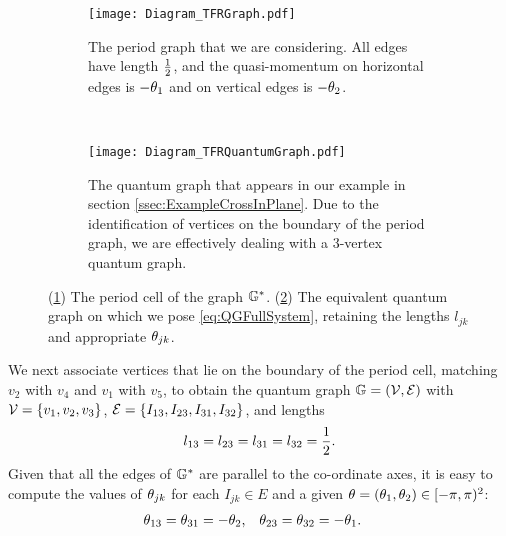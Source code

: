 \begin{figure}[t]
	\centering
	\begin{subfigure}[t]{0.45\textwidth}
		\centering
		\texttt{[image: Diagram\_TFRGraph.pdf]}
		\caption{\label{fig:Diagram_TFRGraph} The period graph that we are considering. All edges have length $\frac{1}{2}$, and the quasi-momentum on horizontal edges is $-\theta_1$ and on vertical edges is $-\theta_2$.}
	\end{subfigure}
	~
	\begin{subfigure}[t]{0.45\textwidth}
		\centering
		\texttt{[image: Diagram\_TFRQuantumGraph.pdf]}
		\caption{\label{fig:Diagram_TFRQuantumGraph} The quantum graph that appears in our example in section \ref{ssec:ExampleCrossInPlane}. Due to the identification of vertices on the boundary of the period graph, we are effectively dealing with a 3-vertex quantum graph.}
	\end{subfigure}
	\caption{\label{fig:5VertexCross} (\ref{fig:Diagram_TFRGraph}) The period cell of the graph $\mathbb{G}^*$. (\ref{fig:Diagram_TFRQuantumGraph}) The equivalent quantum graph on which we pose \eqref{eq:QGFullSystem}, retaining the lengths $l_{jk}$ and appropriate $\theta_{jk}$.}
\end{figure}
We next associate vertices that lie on the boundary of the period cell, matching $v_2$ with $v_4$ and $v_1$ with $v_5$, to obtain the quantum graph $\mathbb{G}=\left( \mathcal{V},\mathcal{E} \right)$ with $\mathcal{V}=\left\{ v_1,v_2,v_3 \right\}$, $\mathcal{E}=\left\{ I_{13},I_{23},I_{31},I_{32} \right\}$, and lengths
\begin{align*}
	l_{13} = l_{23} = l_{31} = l_{32} = \frac{1}{2}.
\end{align*}
Given that all the edges of $\mathbb{G}^*$ are parallel to the co-ordinate axes, it is easy to compute the values of $\theta_{jk}$ for each $I_{jk}\in E$ and a given $\theta=\left( \theta_1,\theta_2 \right)\in[-\pi,\pi)^2$:
\begin{align*}
	\theta_{13} = \theta_{31} = -\theta_2, &\quad \theta_{23} = \theta_{32} = -\theta_1.
\end{align*}

